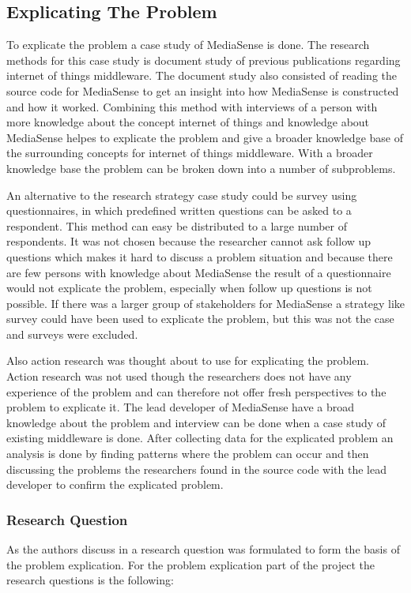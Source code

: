 \subsection{Explicating The Problem}
To explicate the problem a case study of MediaSense is done. The research methods for this case study is document study of previous publications regarding internet of things middleware. The document study also consisted of reading the source code for MediaSense to get an insight into how MediaSense is constructed and how it worked. Combining this method with interviews of a person with more knowledge about the concept internet of things and knowledge about MediaSense helpes to explicate the problem and give a broader knowledge base of the surrounding concepts for internet of things middleware. With a broader knowledge base the problem can be broken down into a number of subproblems. 

An alternative to the research strategy case study could be survey using questionnaires, in which predefined written questions can be asked to a respondent. This method can easy be distributed to a large number of respondents. It was not chosen because the researcher cannot ask follow up questions which makes it hard to discuss a problem situation and because there are few persons with knowledge about MediaSense the result of a questionnaire would not explicate the problem, especially when follow up questions is not possible. If there was a larger group of stakeholders for MediaSense a strategy like survey could have been used to explicate the problem, but this was not the case and surveys were excluded.

Also action research was thought about to use for explicating the problem. Action research was not used though the researchers does not have any experience of the problem and can therefore not offer fresh perspectives to the problem to explicate it. The lead developer of MediaSense have a broad knowledge about the problem and interview can be done when a case study of existing middleware is done. After collecting data for the explicated problem an analysis is done by finding patterns where the problem can occur and then discussing the problems the researchers found in the source code with the lead developer to confirm the explicated problem. 

\subsubsection{Research Question}
As the authors discuss in \cite{johannesson2012design} a research question was formulated to form the basis of the problem explication. For the problem explication part of the project the research questions is the following: 

